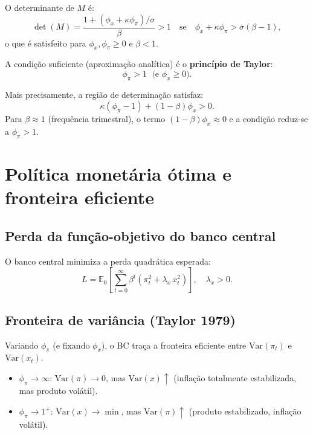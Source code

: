 \documentclass[11pt,a4paper]{article}
\newcommand{\E}{\mathbb{E}}
\begin{document}
O determinante de $M$ é:
\[
  \det(M) = \frac{1 + (\phi_x + \kappa\phi_\pi)/\sigma}{\beta} > 1
  \quad\text{se}\quad \phi_x + \kappa\phi_\pi > \sigma(\beta-1),
\]
o que é satisfeito para $\phi_x,\phi_\pi \geq 0$ e $\beta < 1$.

A condição suficiente (aproximação analítica) é o \textbf{princípio de Taylor}:
\begin{equation}\label{eq:taylor_principle}
  \boxed{\phi_\pi > 1 \;\text{ (e }\phi_x \geq 0).}
\end{equation}

Mais precisamente, a região de determinação satisfaz:
\[
  \kappa(\phi_\pi - 1) + (1-\beta)\phi_x > 0.
\]
Para $\beta \approx 1$ (frequência trimestral), o termo $(1-\beta)\phi_x \approx 0$
e a condição reduz-se a $\phi_\pi > 1$.

\section{Política monetária ótima e fronteira eficiente}

\subsection{Perda da função-objetivo do banco central}

O banco central minimiza a perda quadrática esperada:
\begin{equation}
  L = \E_0\!\left[\sum_{t=0}^\infty \beta^t\!
    \left(\pi_t^2 + \lambda_x\,x_t^2\right)\right],\quad \lambda_x > 0.
\end{equation}

\subsection{Fronteira de variância (Taylor 1979)}

Variando $\phi_\pi$ (e fixando $\phi_x$), o BC traça a fronteira eficiente
entre $\mathrm{Var}(\pi_t)$ e $\mathrm{Var}(x_t)$.

\begin{itemize}
  \item $\phi_\pi \to \infty$: $\mathrm{Var}(\pi) \to 0$, mas
    $\mathrm{Var}(x) \uparrow$ (inflação totalmente estabilizada,
    mas produto volátil).
  \item $\phi_\pi \to 1^+$: $\mathrm{Var}(x) \to \min$, mas
    $\mathrm{Var}(\pi) \uparrow$ (produto estabilizado, inflação volátil).
\end{itemize}
\end{document}
